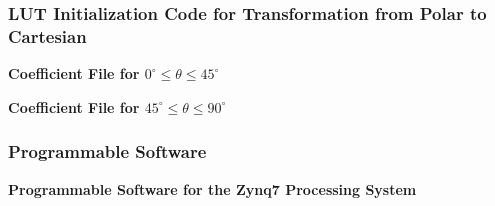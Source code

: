 \subsubsection{LUT Initialization Code for Transformation from Polar to Cartesian} \label{coe_file}
\textbf{Coefficient File for $0^\circ{}\leq{}\theta{}\leq45^\circ$}
\singlespacing

\doublespacing
\par
\textbf{Coefficient File for $45^\circ{}\leq{}\theta{}\leq90^\circ$}
\singlespacing

\doublespacing

\subsubsection{Programmable Software} \label{ps_code}
\textbf{Programmable Software for the Zynq7 Processing System}
\singlespacing

\doublespacing






